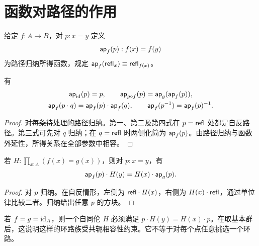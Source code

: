 \section{函数对路径的作用}
\begin{definition}[路径作用]
给定 $f:A\to B$，对 $p:x=y$ 定义
\[
\mathsf{ap}_f(p):f(x)=f(y)
\]
为路径归纳所得函数，规定 $\mathsf{ap}_f(\mathsf{refl}_x)\equiv\mathsf{refl}_{f(x)}$。
\end{definition}
\begin{proposition}[路径作用的函子律]
有
\begin{gather*}
\mathsf{ap}_{\operatorname{id}}(p)=p,
\qquad\mathsf{ap}_{g\circ f}(p)=\mathsf{ap}_g(\mathsf{ap}_f(p)),\\
\mathsf{ap}_f(p\cdot q)=\mathsf{ap}_f(p)\cdot\mathsf{ap}_f(q),
\qquad\mathsf{ap}_f(p^{-1})=\mathsf{ap}_f(p)^{-1}.
\end{gather*}
\end{proposition}
\begin{proof}
对每条待处理的路径归纳。第一、第二及第四式在 $p=\mathsf{refl}$ 处都是自反路径。第三式可先对 $q$ 归纳；在 $q=\mathsf{refl}$ 时两侧化简为 $\mathsf{ap}_f(p)$。由路径归纳与函数外延性，所得关系在全部参数中相容。
\end{proof}
\begin{proposition}[同伦的自然性方块]\label{prop:homotopy-naturality}
若 $H:\prod_{x:A}(f(x)=g(x))$，则对 $p:x=y$，有
\[
\mathsf{ap}_f(p)\cdot H(y)=H(x)\cdot\mathsf{ap}_g(p).
\]
\end{proposition}
\begin{proof}
对 $p$ 归纳。在自反情形，左侧为 $\mathsf{refl}\cdot H(x)$，右侧为 $H(x)\cdot\mathsf{refl}$，通过单位律比较二者。归纳给出任意 $p$ 的方块。
\end{proof}
\begin{example}
若 $f=g=\operatorname{id}_A$，则一个自同伦 $H$ 必须满足 $p\cdot H(y)=H(x)\cdot p$。在取基本群后，这说明这样的环路族受共轭相容性约束。它不等于对每个点任意挑选一个环路。
\end{example}

